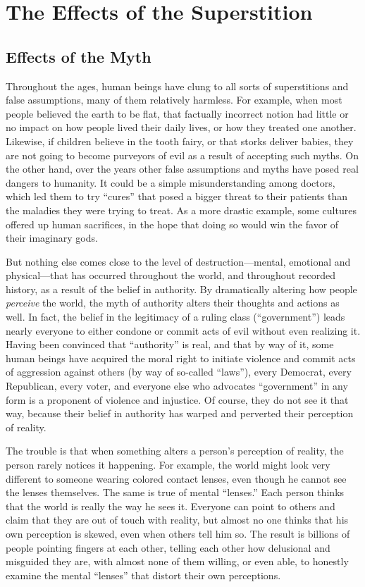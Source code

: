 \documentclass{book}
\begin{document}
\chapter{The Effects of the Superstition}

\section{Effects of the Myth}

Throughout the ages, human beings have clung to all sorts of superstitions and false assumptions, many of them relatively harmless. For example, when most people believed the earth to be flat, that factually incorrect notion had little or no impact on how people lived their daily lives, or how they treated one another. Likewise, if children believe in the tooth fairy, or that storks deliver babies, they are not going to become purveyors of evil as a result of accepting such myths. On the other hand, over the years other false assumptions and myths have posed real dangers to humanity. It could be a simple misunderstanding among doctors, which led them to try \enquote{cures} that posed a bigger threat to their patients than the maladies they were trying to treat. As a more drastic example, some cultures offered up human sacrifices, in the hope that doing so would win the favor of their imaginary gods.

But nothing else comes close to the level of destruction---mental, emotional and physical---that has occurred throughout the world, and throughout recorded history, as a result of the belief in authority. By dramatically altering how people \emph{perceive} the world, the myth of authority alters their thoughts and actions as well. In fact, the belief in the legitimacy of a ruling class (\enquote{government}) leads nearly everyone to either condone or commit acts of evil without even realizing it. Having been convinced that \enquote{authority} is real, and that by way of it, some human beings have acquired the moral right to initiate violence and commit acts of aggression against others (by way of so-called \enquote{laws}), every Democrat, every Republican, every voter, and everyone else who advocates \enquote{government} in any form is a proponent of violence and injustice. Of course, they do not see it that way, because their belief in authority has warped and perverted their perception of reality.

The trouble is that when something alters a person's perception of reality, the person rarely notices it happening. For example, the world might look very different to someone wearing colored contact lenses, even though he cannot see the lenses themselves. The same is true of mental \enquote{lenses.} Each person thinks that the world is really the way he sees it. Everyone can point to others and claim that they are out of touch with reality, but almost no one thinks that his own perception is skewed, even when others tell him so. The result is billions of people pointing fingers at each other, telling each other how delusional and misguided they are, with almost none of them willing, or even able, to honestly examine the mental \enquote{lenses} that distort their own perceptions.
\end{document}
